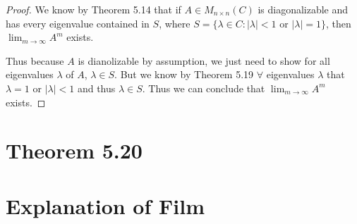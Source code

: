 \documentclass{amsart}
\theoremstyle{definition}
\theoremstyle{remark}
\numberwithin{equation}{section}
\begin{document}
\begin{proof}

We know by Theorem 5.14 \cite{friedberg2003linear} that if $A \in M_{n \times n}(C)$ is diagonalizable and has every eigenvalue contained in $S$, where $S = \{ \lambda \in C: |\lambda| < 1$ or $|\lambda| = 1\}$, then $\lim_{m \to \infty} A^m$ exists.


Thus because $A$ is dianolizable by assumption, we just need to show for all eigenvalues $\lambda$ of $A$, $\lambda \in S$.
But we know by Theorem 5.19 $\forall$ eigenvalues $\lambda$ that $\lambda = 1$ or $|\lambda| < 1$ and thus $\lambda \in S$.
Thus we can conclude that $\lim_{m \to \infty} A^m$ exists.

\end{proof}

\section{Theorem 5.20}






\section{Explanation of Film}


 
\end{document}
